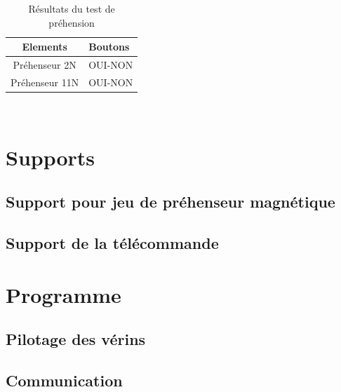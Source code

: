 \begin{table}[h]
    \begin{center}
        \caption{Résultats du test de préhension}
        \begin{tabular}{|c|l|}
            Elements       & Boutons \\ \hline
            Préhenseur 2N  & OUI-NON \\
            Préhenseur 11N & OUI-NON \\
        \end{tabular}
    \end{center}
\end{table}\\

\section{Supports}

\subsection{Support pour jeu de préhenseur magnétique}
\subsection{Support de la télécommande}

\section{Programme}
\subsection{Pilotage des vérins}
\subsection{Communication}